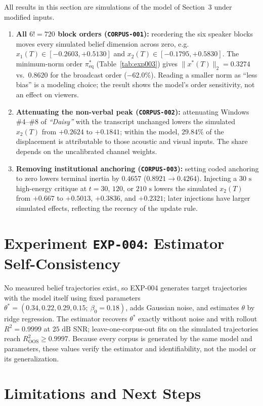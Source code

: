 \documentclass[10pt,letterpaper]{article}
\begin{document}
All results in this section are simulations of the model of Section~3 under modified inputs.
\begin{enumerate}
  \item \textbf{All $6! = 720$ block orders (\texttt{CORPUS-001}):} reordering the six speaker blocks moves every simulated belief dimension across zero, e.g.\ $x_1(T) \in [-0.2603, +0.5130]$ and $x_2(T) \in [-0.1795, +0.5830]$. The minimum-norm order $\pi^*_{\mathrm{eq}}$ (Table~\ref{tab:exp003}) gives $\|x^*(T)\|_2 = 0.3274$ vs.\ $0.8620$ for the broadcast order ($-62.0\%$). Reading a smaller norm as ``less bias'' is a modeling choice; the result shows the model's order sensitivity, not an effect on viewers.
  \item \textbf{Attenuating the non-verbal peak (\texttt{CORPUS-002}):} attenuating Windows \#4--\#8 of \emph{``Daisy''} with the transcript unchanged lowers the simulated $x_2(T)$ from $+0.2624$ to $+0.1841$; within the model, $29.84\%$ of the displacement is attributable to those acoustic and visual inputs. The share depends on the uncalibrated channel weights.
  \item \textbf{Removing institutional anchoring (\texttt{CORPUS-003}):} setting coded anchoring to zero lowers terminal inertia by $0.4657$ ($0.8921 \to 0.4264$). Injecting a $30\text{ s}$ high-energy critique at $t = 30$, $120$, or $210\text{ s}$ lowers the simulated $x_2(T)$ from $+0.667$ to $+0.5013$, $+0.3836$, and $+0.2321$; later injections have larger simulated effects, reflecting the recency of the update rule.
\end{enumerate}

\section{Experiment \texttt{EXP-004}: Estimator Self-Consistency}

No measured belief trajectories exist, so EXP-004 generates target trajectories with the model itself using fixed parameters $\theta^* = (0.34, 0.22, 0.29, 0.15;\ \beta_0 = 0.18)$, adds Gaussian noise, and estimates $\theta$ by ridge regression. The estimator recovers $\theta^*$ exactly without noise and with rollout $R^2 = 0.9999$ at $25\text{ dB}$ SNR; leave-one-corpus-out fits on the simulated trajectories reach $R^2_{\mathrm{OOS}} \ge 0.9997$. Because every corpus is generated by the same model and parameters, these values verify the estimator and identifiability, not the model or its generalization.

\section{Limitations and Next Steps}
\end{document}
